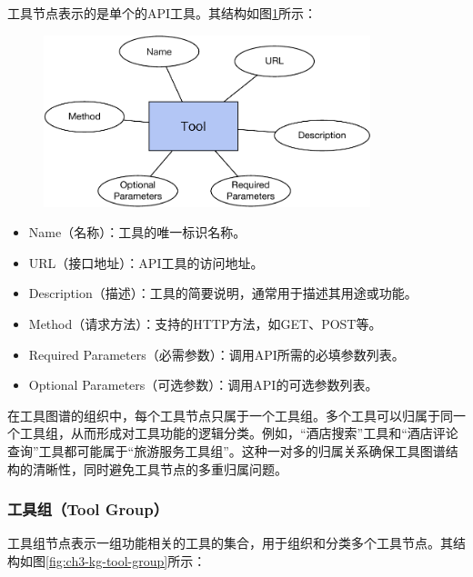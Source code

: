 工具节点表示的是单个的API工具。其结构如图\ref{fig:ch3-kg-tool}所示：

\begin{figure}[H]
    \vspace{1em}
    \centering
    \setlength{\abovecaptionskip}{10pt} %
    \includegraphics[height=5cm]{../assets/图谱格式-tool.pdf}
    \label{fig:ch3-kg-tool}
\end{figure}

\begin{itemize}
    \item Name（名称）：工具的唯一标识名称。
    \item URL（接口地址）：API工具的访问地址。
    \item Description（描述）：工具的简要说明，通常用于描述其用途或功能。
    \item Method（请求方法）：支持的HTTP方法，如GET、POST等。
    \item Required Parameters（必需参数）：调用API所需的必填参数列表。
    \item Optional Parameters（可选参数）：调用API的可选参数列表。
\end{itemize}

在工具图谱的组织中，每个工具节点只属于一个工具组。多个工具可以归属于同一个工具组，从而形成对工具功能的逻辑分类。例如，“酒店搜索”工具和“酒店评论查询”工具都可能属于“旅游服务工具组”。这种一对多的归属关系确保工具图谱结构的清晰性，同时避免工具节点的多重归属问题。

\subsubsection{工具组（Tool Group）}

工具组节点表示一组功能相关的工具的集合，用于组织和分类多个工具节点。其结构如图\ref{fig:ch3-kg-tool-group}所示：

